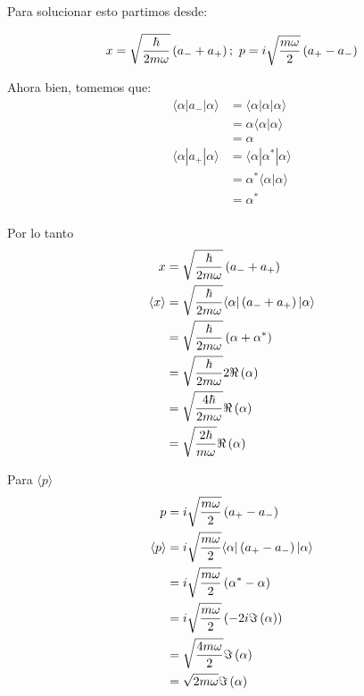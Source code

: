 \documentclass{report}
\begin{document}
\chapter{}

\chapter{}

\section{}

Para solucionar esto partimos desde:

\[
  x = \sqrt{\frac{\hbar}{2m\omega}} \left(a_{-} + a_{+}\right);\ p = i \sqrt{\frac{m\omega}{2}}\left(a_{+} - a_{-}\right)
\]

Ahora bien, tomemos que:
\begin{align*}
  \langle \alpha | a_{-} | \alpha \rangle &= \langle \alpha | \alpha | \alpha \rangle \\ &= \alpha \langle \alpha  | \alpha \rangle \\ &= \alpha\\
  \langle \alpha | a_{+} | \alpha \rangle &= \langle \alpha | \alpha^* | \alpha \rangle \\ &= \alpha^* \langle \alpha  | \alpha \rangle \\ &= \alpha^*\\
\end{align*}

Por lo tanto
\begin{align*}
  x &= \sqrt{\frac{\hbar}{2m\omega}} \left(a_{-} + a_{+}\right)\\
  \langle x \rangle &= \sqrt{\frac{\hbar}{2m\omega}} \langle \alpha |\left(a_{-} + a_{+}\right)| \alpha \rangle\\
  &= \sqrt{\frac{\hbar}{2m\omega}} \left(\alpha + \alpha^*\right)\\
  &= \sqrt{\frac{\hbar}{2m\omega}} 2\Re\left(\alpha\right)\\
  &= \sqrt{\frac{4\hbar}{2m\omega}} \Re\left(\alpha\right)\\
  &= \sqrt{\frac{2\hbar}{m\omega}} \Re\left(\alpha\right)
\end{align*}

Para $\langle p \rangle$
\begin{align*}
  p &= i \sqrt{\frac{m\omega}{2}}\left(a_{+} - a_{-}\right)\\
  \langle p \rangle &= i \sqrt{\frac{m\omega}{2}}\langle \alpha | \left(a_{+} - a_{-}\right) | \alpha \rangle\\
  &= i \sqrt{\frac{m\omega}{2}}\left(\alpha^* - \alpha\right) \\
  &= i \sqrt{\frac{m\omega}{2}}\left(-2i\Im\left(\alpha\right)\right)\\
  &= \sqrt{\frac{4 m\omega}{2}}\Im\left(\alpha\right)\\
  &= \sqrt{2 m\omega}\Im\left(\alpha\right)
\end{align*}
\end{document}
